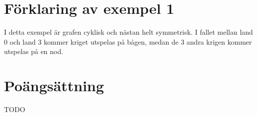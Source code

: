 \section*{Förklaring av exempel 1}

I detta exempel är grafen cyklisk och nästan helt symmetrisk. I fallet mellan
land 0 och land 3 kommer kriget utspelas på bågen, medan de 3 andra krigen
kommer utspelas på en nod.

\section*{Poängsättning}

TODO


